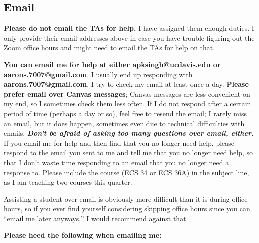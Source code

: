 \documentclass{article}
\begin{document}
\subsection{Email}

\textbf{Please do not email the TAs for help.} I have assigned them enough duties. I only provide their email addresses above in case you have trouble figuring out the Zoom office hours and might need to email the TAs for help on that.

\textbf{You can email me for help at either \textbf{apksingh@ucdavis.edu} or \textbf{aarons.7007@gmail.com}}. I usually end up responding with \textbf{aarons.7007@gmail.com}. I try to check my email at least once a day. \textbf{Please prefer email over Canvas messages}; Canvas messages are less convenient on my end, so I sometimes check them less often. If I do not respond after a certain period of time (perhaps a day or so), feel free to resend the email; I rarely miss an email, but it does happen, sometimes even due to technical difficulties with emails. \textbf{\textit{Don't be afraid of asking too many questions over email, either.}} If you email me for help and then find that you no longer need help, please respond to the email you sent to me and tell me that you no longer need help, so that I don't waste time responding to an email that you no longer need a response to. Please include the course (ECS 34 or ECS 36A) in the subject line, as I am teaching two courses this quarter.

Assisting a student over email is obviously more difficult than it is during office hours, so if you ever find yourself considering skipping office hours since you can ``email me later anyways,'' I would recommend against that.

\textbf{Please heed the following when emailing me:}
\end{document}
